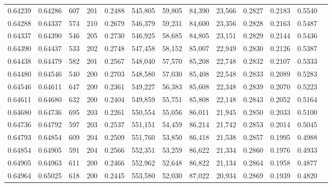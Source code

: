 \begin{tabular}{rrrrrrrrrrrrr}
0.64239 & 0.64286 &   607 & 201 &                                     0.2488 & 545,805 &  59,805 &  84,390 &  23,566 & 0.2827 & 0.2183 & 0.5540 \\
0.64288 & 0.64337 &   574 & 210 &                                     0.2679 & 546,379 &  59,231 &  84,600 &  23,356 & 0.2828 & 0.2163 & 0.5487 \\
0.64337 & 0.64390 &   546 & 205 &                                     0.2730 & 546,925 &  58,685 &  84,805 &  23,151 & 0.2829 & 0.2144 & 0.5436 \\
0.64390 & 0.64437 &   533 & 202 &                                     0.2748 & 547,458 &  58,152 &  85,007 &  22,949 & 0.2830 & 0.2126 & 0.5387 \\
0.64438 & 0.64479 &   582 & 201 &                                     0.2567 & 548,040 &  57,570 &  85,208 &  22,748 & 0.2832 & 0.2107 & 0.5333 \\
0.64480 & 0.64546 &   540 & 200 &                                     0.2703 & 548,580 &  57,030 &  85,408 &  22,548 & 0.2833 & 0.2089 & 0.5283 \\
0.64546 & 0.64611 &   647 & 200 &                                     0.2361 & 549,227 &  56,383 &  85,608 &  22,348 & 0.2839 & 0.2070 & 0.5223 \\
0.64611 & 0.64680 &   632 & 200 &                                     0.2404 & 549,859 &  55,751 &  85,808 &  22,148 & 0.2843 & 0.2052 & 0.5164 \\
0.64680 & 0.64736 &   695 & 203 &                                     0.2261 & 550,554 &  55,056 &  86,011 &  21,945 & 0.2850 & 0.2033 & 0.5100 \\
0.64736 & 0.64792 &   597 & 203 &                                     0.2537 & 551,151 &  54,459 &  86,214 &  21,742 & 0.2853 & 0.2014 & 0.5045 \\
0.64793 & 0.64854 &   609 & 204 &                                     0.2509 & 551,760 &  53,850 &  86,418 &  21,538 & 0.2857 & 0.1995 & 0.4988 \\
0.64854 & 0.64905 &   591 & 204 &                                     0.2566 & 552,351 &  53,259 &  86,622 &  21,334 & 0.2860 & 0.1976 & 0.4933 \\
0.64905 & 0.64963 &   611 & 200 &                                     0.2466 & 552,962 &  52,648 &  86,822 &  21,134 & 0.2864 & 0.1958 & 0.4877 \\
0.64964 & 0.65025 &   618 & 200 &                                     0.2445 & 553,580 &  52,030 &  87,022 &  20,934 & 0.2869 & 0.1939 & 0.4820 \\

\end{tabular}
